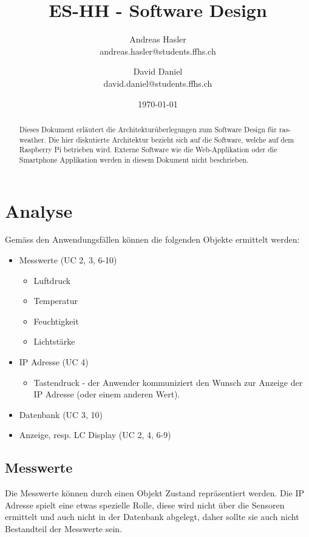 \documentclass[
    10pt,
    a4paper,
]{scrartcl}
\title{ES-HH - Software Design}
\author{Andreas Hasler \\{\small andreas.hasler@students.ffhs.ch}
\and David Daniel\\{\small david.daniel@students.ffhs.ch}}
\date{\today}
\begin{document}
\maketitle
{}%

\begin{abstract}
    Dieses Dokument erläutert die Architekturüberlegungen zum Software Design für
    ras-weather. Die hier diskutierte Architektur bezieht sich auf die Software, welche
    auf dem Raspberry Pi betrieben wird. Externe Software wie die Web-Applikation oder die
    Smartphone Applikation werden in diesem Dokument nicht beschrieben.
\end{abstract}

\clearpage
{}%
\tableofcontents

\section{Analyse}

Gemäss den Anwendungsfällen \cite{project-doc} können die folgenden Objekte ermittelt
werden:

\begin{itemize}
    \item Messwerte (UC 2, 3, 6-10)
        \begin{itemize}
            \item Luftdruck
            \item Temperatur
            \item Feuchtigkeit
            \item Lichtstärke
        \end{itemize}
    \item IP Adresse (UC 4)
        \begin{itemize}
            \item Tastendruck - der Anwender kommuniziert den Wunsch zur Anzeige der IP
                Adresse (oder einem anderen Wert).
        \end{itemize}
    \item Datenbank (UC 3, 10)
    \item Anzeige, resp. LC Display (UC 2, 4, 6-9)
\end{itemize}

\subsection{Messwerte}
Die Messwerte können durch einen Objekt Zustand repräsentiert werden. Die IP Adresse
spielt eine etwas spezielle Rolle, diese wird nicht über die Sensoren ermittelt und auch
nicht in der Datenbank abgelegt, daher sollte sie auch nicht Bestandteil der Messwerte
sein.
\end{document}

